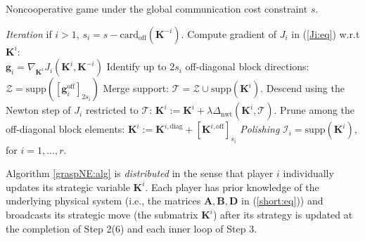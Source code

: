 \documentclass[12pt, draftclsnofoot,onecolumn]{IEEEtran}
\begin{document}
\begin{algorithm}[!b]
	 \caption{Noncooperative game under the global communication cost constraint $s$.}
	\begin{algorithmic}
 {\it Iteration} 
 {if $i>1$, $s_i = s-\mathrm{card}_{\mathrm{off}}({\boldsymbol K}^{-i}) $.}
	 {Compute gradient of $J_i$ in (\ref{Ji:eq}) w.r.t ${\boldsymbol K}^i$:\\ ${\boldsymbol g}_i = \nabla_{{\boldsymbol K}^i}J_i({\boldsymbol K}^i,{\boldsymbol K}^{-i})$ }
	 {Identify up to $2s_i$ off-diagonal block directions: $\mathcal{Z} = \mathrm{supp}([{\boldsymbol g}_i^{\mathrm{off}}]_{2s_i})$}
	 {Merge support: $\mathcal{T} = \mathcal{Z} \cup \mathrm{supp}({\boldsymbol K}^i).$}
	 {Descend using the Newton step of $J_i$ restricted to $\mathcal{T}$: ${\boldsymbol K}^i := {\boldsymbol K}^i + \lambda \Delta_{\mathrm{nwt}}({\boldsymbol K}^i,\mathcal{T}).$}
	 {Prune among the off-diagonal block elements: ${\boldsymbol K}^i:= {\boldsymbol K}^{i,\mathrm{diag}}+[{\boldsymbol K}^{i,\mathrm{off}}]_{s_i} $}
	\EndFor
    \EndWhile
	 {\it Polishing}
	\State $\mathcal{I}_i = \mathrm{supp}({\boldsymbol K}^i)$, for $i=1,...,r$.
	\EndFor
	\EndWhile
\end{algorithmic}
	 \label{graspNE:alg}
\end{algorithm}

Algorithm \ref{graspNE:alg} is {\it distributed} in the sense that player $i$ individually updates its strategic variable ${\boldsymbol K}^i$. Each player has prior knowledge of the underlying physical system (i.e., the matrices ${\boldsymbol A},{\boldsymbol B},\boldsymbol D$ in (\ref{short:eq})) and broadcasts its strategic move (the submatrix ${\boldsymbol K}^i$) after its strategy is updated at the completion of Step 2(6) and each inner loop of Step 3. 
\end{document}

